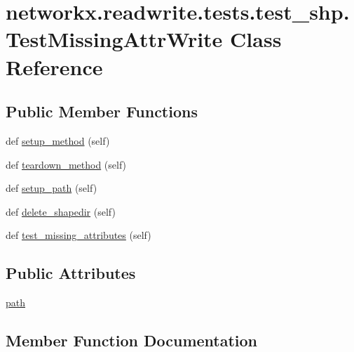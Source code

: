 \hypertarget{classnetworkx_1_1readwrite_1_1tests_1_1test__shp_1_1TestMissingAttrWrite}{}\section{networkx.\+readwrite.\+tests.\+test\+\_\+shp.\+Test\+Missing\+Attr\+Write Class Reference}
\label{classnetworkx_1_1readwrite_1_1tests_1_1test__shp_1_1TestMissingAttrWrite}
\subsection*{Public Member Functions}
\begin{DoxyCompactItemize}
\item 
def \hyperlink{classnetworkx_1_1readwrite_1_1tests_1_1test__shp_1_1TestMissingAttrWrite_af62c6fca33cf5fff539d6b1b56971f22}{setup\+\_\+method} (self)
\item 
def \hyperlink{classnetworkx_1_1readwrite_1_1tests_1_1test__shp_1_1TestMissingAttrWrite_a9ed3fdf43ea047c73843d78c3c987e3f}{teardown\+\_\+method} (self)
\item 
def \hyperlink{classnetworkx_1_1readwrite_1_1tests_1_1test__shp_1_1TestMissingAttrWrite_a5e9f73492f87f968c71c069c21623b27}{setup\+\_\+path} (self)
\item 
def \hyperlink{classnetworkx_1_1readwrite_1_1tests_1_1test__shp_1_1TestMissingAttrWrite_aedf735494d38ddb0290a3677c4a542fc}{delete\+\_\+shapedir} (self)
\item 
def \hyperlink{classnetworkx_1_1readwrite_1_1tests_1_1test__shp_1_1TestMissingAttrWrite_ad13626db42e1a3dcc3ba68be0f773fce}{test\+\_\+missing\+\_\+attributes} (self)
\end{DoxyCompactItemize}
\subsection*{Public Attributes}
\begin{DoxyCompactItemize}
\item 
\hyperlink{classnetworkx_1_1readwrite_1_1tests_1_1test__shp_1_1TestMissingAttrWrite_a7a29d6c0fa338f42ef07d8888fc2e27c}{path}
\end{DoxyCompactItemize}


\subsection{Member Function Documentation}
\mbox{\label{classnetworkx_1_1readwrite_1_1tests_1_1test__shp_1_1TestMissingAttrWrite_aedf735494d38ddb0290a3677c4a542fc}} 
